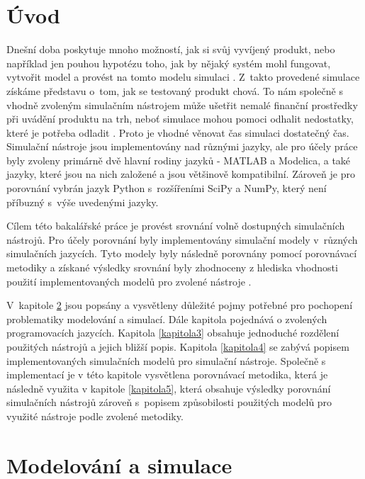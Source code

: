 \chapter{Úvod}

Dnešní doba poskytuje mnoho možností, jak si svůj vyvíjený produkt, nebo například jen pouhou hypotézu toho, jak by nějaký systém mohl fungovat, vytvořit model a provést na tomto modelu simulaci \cite{NEGRAO20113051}. Z~takto provedené simulace získáme představu o~tom, jak se testovaný produkt chová. To nám společně s vhodně zvoleným simulačním nástrojem může ušetřit nemalé finanční prostředky při uvádění produktu na trh, neboť simulace mohou pomoci odhalit nedostatky, které je potřeba odladit \cite{cohen2010cost}. Proto je vhodné věnovat čas simulaci dostatečný čas. Simulační nástroje jsou implementovány nad různými jazyky, ale pro účely práce byly zvoleny primárně dvě hlavní rodiny jazyků - MATLAB a Modelica, a také jazyky, které jsou na nich založené a jsou většinově kompatibilní. Zároveň je pro porovnání vybrán jazyk Python s~rozšířeními SciPy a NumPy, který není příbuzný s~výše uvedenými jazyky.

Cílem této bakalářské práce je provést srovnání volně dostupných simulačních nástrojů. Pro účely porovnání byly implementovány simulační modely v~různých simulačních jazycích. Tyto modely byly následně porovnány pomocí porovnávací metodiky a získané výsledky srovnání byly zhodnoceny z hlediska vhodnosti použití implementovaných modelů pro zvolené nástroje \cite{jones2004traffic}.

V~kapitole \ref{kapitola2} jsou popsány a vysvětleny důležité pojmy potřebné pro pochopení problematiky modelování a simulací. Dále kapitola pojednává o zvolených programovacích jazycích. Kapitola \ref{kapitola3} obsahuje jednoduché rozdělení použitých nástrojů a jejich bližší popis. Kapitola \ref{kapitola4} se zabývá popisem implementovaných simulačních modelů pro simulační nástroje. Společně s implementací je v této kapitole vysvětlena porovnávací metodika, která je následně využita v kapitole \ref{kapitola5}, která obsahuje výsledky porovnání simulačních nástrojů zároveň s~popisem způsobilosti použitých modelů pro využité nástroje podle zvolené metodiky.

\chapter{Modelování a simulace}
\label{kapitola2}

